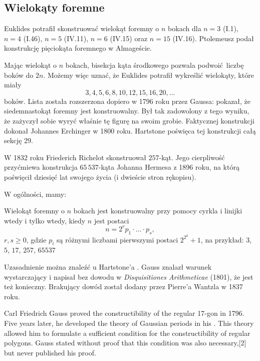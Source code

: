 
\subsection{Wielokąty foremne}
Euklides potrafił skonstruować wielokąt foremny o $n$ bokach dla $n = 3$ (I.1), $n = 4$ (I.46), $n = 5$ (IV.11), $n = 6$ (IV.15) oraz $n = 15$ (IV.16).
Ptolemeusz podał konstrukcję pięciokąta foremnego w Almageście.

Mając wielokąt o $n$ bokach, bisekcja kąta środkowego pozwala podwoić liczbę boków do $2n$.
Możemy więc uznać, że Euklides potrafił wykreślić wielokąty, które miały
\begin{equation}
    3, 4, 5, 6, 8, 10, 12, 15, 16, 20, \ldots
\end{equation}
boków.
Lista została rozszerzona dopiero w 1796 roku przez Gaussa: pokazał, że siedemnastokąt foremny jest konstruowalny.
Był tak zadowolony z tego wyniku, że zażyczył sobie wyryć właśnie tę figurę na swoim grobie.
Faktycznej konstrukcji dokonał Johannes Erchinger w 1800 roku.
%
Hartstone \cite[s. 250-259]{hartshorne2000} poświęca tej konstrukcji całą sekcję 29.

W 1832 roku Friederich Richelot skonstruował $257$-kąt.
Jego cierpliwość przyćmiewa konstrukcja $65\,537$-kąta Johanna Hermesa z 1896 roku, na którą poświęcił dziesięć lat swojego życia (i dwieście stron rękopisu).

W ogólności, mamy:
\begin{theorem}
    Wielokąt foremny o $n$ bokach jest konstruowalny przy pomocy cyrkla i linijki wtedy i tylko wtedy, kiedy $n$ jest postaci
    \begin{equation}
        n = 2^r p_1 \cdot \ldots \cdot p_s,
    \end{equation}
    $r, s \ge 0$, gdzie $p_i$ są różnymi liczbami pierwszymi postaci $2^{2^k} + 1$, na przykład: $3$, $5$, $17$, $257$, $65537$
\end{theorem}

Uzasadnienie można znaleźć u Hartstone'a \cite[s. 258]{hartshorne2000}.
Gauss znalazł warunek wystarczający i napisał bez dowodu w \emph{Disquisitiones Arithmeticae} (1801), że jest też konieczny.
Brakujący dowód został dodany przez Pierre'a Wantzla w 1837 roku.

Carl Friedrich Gauss proved the constructibility of the regular 17-gon in 1796. Five years later, he developed the theory of Gaussian periods in his . This theory allowed him to formulate a sufficient condition for the constructibility of regular polygons. Gauss stated without proof that this condition was also necessary,[2] but never published his proof.

